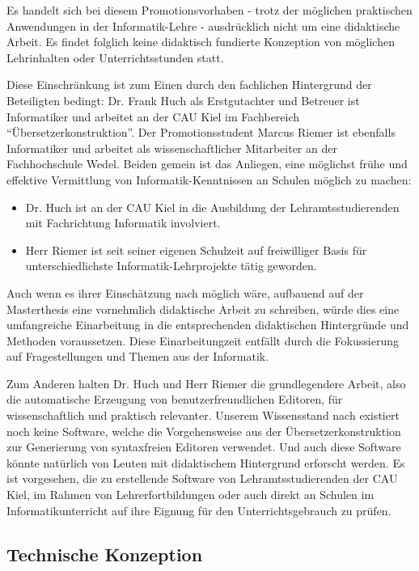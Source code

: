 \documentclass[paper=a4,fontsize=11pt,parskip=half]{scrartcl}
\begin{document}
Es handelt sich bei diesem Promotionsvorhaben - trotz der möglichen praktischen Anwendungen in der Informatik-Lehre - ausdrücklich nicht um eine didaktische Arbeit. Es findet folglich keine didaktisch fundierte Konzeption von möglichen Lehrinhalten oder Unterrichtsstunden statt.

Diese Einschränkung ist zum Einen durch den fachlichen Hintergrund der Beteiligten bedingt: Dr. Frank Huch als Erstgutachter und Betreuer ist Informatiker und arbeitet an der CAU Kiel im Fachbereich \enquote{Übersetzerkonstruktion}. Der Promotionsstudent Marcus Riemer ist ebenfalls Informatiker und arbeitet als wissenschaftlicher Mitarbeiter an der Fachhochschule Wedel. Beiden gemein ist das Anliegen, eine möglichst frühe und effektive Vermittlung von Informatik-Kenntnissen an Schulen möglich zu machen:

\begin{itemize}
\item Dr. Huch ist an der CAU Kiel in die Ausbildung der Lehramtsstudierenden mit Fachrichtung Informatik involviert.
\item Herr Riemer ist seit seiner eigenen Schulzeit auf freiwilliger Basis für unterschiedlichste Informatik-Lehrprojekte tätig geworden.
\end{itemize}

Auch wenn es ihrer Einschätzung nach möglich wäre, aufbauend auf der Masterthesis eine vornehmlich didaktische Arbeit zu schreiben, würde dies eine umfangreiche Einarbeitung in die entsprechenden didaktischen Hintergründe und Methoden voraussetzen. Diese Einarbeitungzeit entfällt durch die Fokussierung auf Fragestellungen und Themen aus der Informatik.

Zum Anderen halten Dr. Huch und Herr Riemer die grundlegendere Arbeit, also die automatische Erzeugung von benutzerfreundlichen Editoren, für wissenschaftlich und praktisch relevanter. Unserem Wissensstand nach existiert noch keine Software, welche die Vorgehensweise aus der Übersetzerkonstruktion zur Generierung von syntaxfreien Editoren verwendet. Und auch diese Software könnte natürlich von Leuten mit didaktischem Hintergrund erforscht werden. Es ist vorgesehen, die zu erstellende Software von Lehramtsstudierenden der CAU Kiel, im Rahmen von Lehrerfortbildungen oder auch direkt an Schulen im Informatikunterricht auf ihre Eignung für den Unterrichtsgebrauch zu prüfen.

\subsection{Technische Konzeption}
\end{document}
